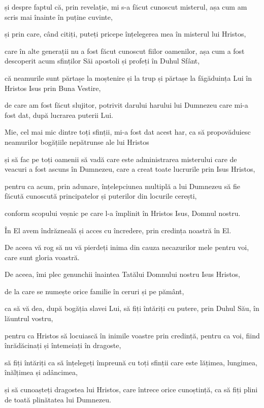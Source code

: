 {și despre faptul că, prin revelație, mi s-a făcut cunoscut misterul, așa cum am scris mai înainte în puține cuvinte,

și prin care, când citiți, puteți pricepe înțelegerea mea în misterul lui Hristos,

care în alte generații nu a fost făcut cunoscut fiilor oamenilor, așa cum a fost descoperit acum sfinților Săi apostoli și profeți în Duhul Sfânt,

că neamurile sunt părtașe la moștenire și la trup și părtașe la făgăduința Lui în Hristos Isus prin Buna Vestire,

de care am fost făcut slujitor, potrivit darului harului lui Dumnezeu care mi-a fost dat, după lucrarea puterii Lui.

Mie, cel mai mic dintre toți sfinții, mi-a fost dat acest har, ca să propovăduiesc neamurilor bogățiile nepătrunse ale lui Hristos

și să fac pe toți oamenii să vadă care este administrarea misterului care de veacuri a fost ascuns în Dumnezeu, care a creat toate lucrurile prin Isus Hristos,

pentru ca acum, prin adunare, înțelepciunea multiplă a lui Dumnezeu să fie făcută cunoscută principatelor și puterilor din locurile cerești,

conform scopului veșnic pe care l-a împlinit în Hristos Isus, Domnul nostru.

În El avem îndrăzneală și acces cu încredere, prin credința noastră în El.

De aceea vă rog să nu vă pierdeți inima din cauza necazurilor mele pentru voi, care sunt gloria voastră.


\par }{\PP {}De aceea, îmi plec genunchii înaintea Tatălui Domnului nostru Isus Hristos,

de la care se numește orice familie în ceruri și pe pământ,

ca să vă dea, după bogăția slavei Lui, să fiți întăriți cu putere, prin Duhul Său, în lăuntrul vostru,

pentru ca Hristos să locuiască în inimile voastre prin credință, pentru ca voi, fiind înrădăcinați și întemeiați în dragoste,

să fiți întăriți ca să înțelegeți împreună cu toți sfinții care este lățimea, lungimea, înălțimea și adâncimea,

și să cunoașteți dragostea lui Hristos, care întrece orice cunoștință, ca să fiți plini de toată plinătatea lui Dumnezeu.


}
